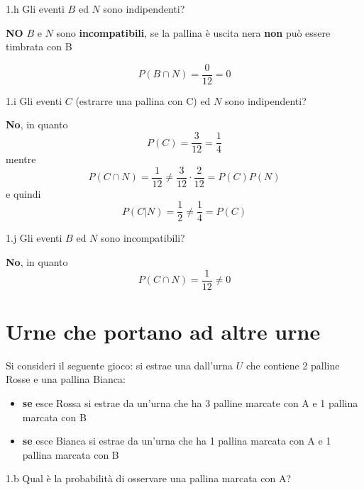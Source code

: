 \documentclass[
  11pt,
]{book}
\providecommand{\tightlist}{%
  \setlength{\itemsep}{0pt}\setlength{\parskip}{0pt}}
\theoremstyle{mytheoremstyle}
\theoremstyle{mydefstyle}
\newenvironment{sol}
  {
  \begin{tcolorbox}[enhanced,breakable,arc=0.1mm,boxrule=1pt,colback=white,colframe=iblue,
  title=\bf \fontfamily{lmss}\selectfont \hspace{.5 cm} Soluzione,drop fuzzy shadow]

}{
\end{tcolorbox}
  }
\begin{document}
1.h Gli eventi \(B\) ed \(N\) sono indipendenti?

\begin{sol}
\textbf{NO} \(B\) e \(N\) sono \textbf{incompatibili}, se la pallina è uscita nera \textbf{non} può essere timbrata con B

\[P(B\cap N)=\frac0{12}=0\]

\end{sol}

1.i Gli eventi \(C\) (estrarre una pallina con C) ed \(N\) sono indipendenti?

\begin{sol}
\textbf{No}, in quanto
\[
P(C)=\frac3{12}=\frac14
\]
mentre
\[
P(C\cap N)=\frac1{12}\neq \frac{3}{12}\cdot\frac2{12}=P(C)P(N)
\]
e quindi
\[
P(C|N)=\frac12\neq\frac14=P(C)
\]

\end{sol}

1.j Gli eventi \(B\) ed \(N\) sono incompatibili?

\begin{sol}
\textbf{No}, in quanto
\[
P(C\cap N)=\frac1{12}\neq 0
\]

\end{sol}

\section{Urne che portano ad altre urne}\label{urne-che-portano-ad-altre-urne}

Si consideri il seguente gioco: si estrae una dall'urna \(U\) che contiene 2 palline Rosse e una pallina Bianca:
\small

\begin{itemize}
\tightlist
\item
  \textbf{se} esce Rossa si estrae da un'urna che ha 3 palline marcate con A e 1 pallina marcata con B
\item
  \textbf{se} esce Bianca si estrae da un'urna che ha 1 pallina marcata con A e 1 pallina marcata con B
\end{itemize}

\rm

1.b Qual è la probabilità di osservare una pallina marcata con A?
\end{document}
